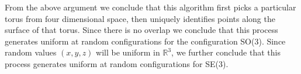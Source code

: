 From the above argument we conclude that this algorithm first picks a
particular torus from four dimensional space, then uniquely identifies
points along the surface of that torus. Since there is no overlap we conclude
that this process generates uniform at random configurations for the
configuration SO(3). Since random values $(x,y,z)$ will be uniform in
$\mathbb{R}^3$, we further conclude that this process generates uniform at
random configurations for SE(3).
